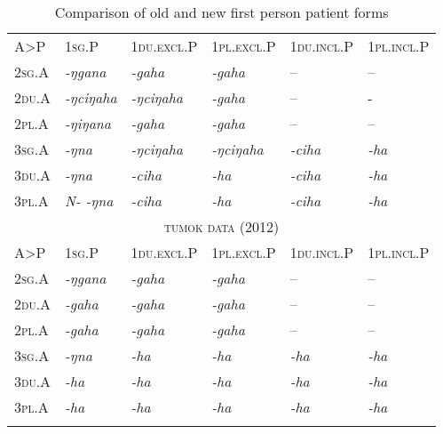 \begin{table}[htp]
\begin{tabular}{llllll}
\lsptoprule
\multicolumn{6}{c}{{\scshape omruwa data (1984)}} \\
\midrule
	A>P			& {\scshape 1sg.P}		&{\scshape 1du.excl.P} &{\scshape 1pl.excl.P}		&{\scshape 1du.incl.P} &{\scshape 1pl.incl.P}	\\
\midrule                                                                    
{\scshape 2sg.A}&\emph{-ŋgana}	&\emph{-gaha}	&\emph{-gaha}			 & --					 &--						\\
{\scshape 2du.A}&\emph{-ŋciŋaha}	&\emph{-ŋciŋaha} &\emph{-gaha}			 & --					 &-						\\
{\scshape 2pl.A}&\emph{-ŋiŋana}	&\emph{-gaha}	&\emph{-gaha}			  & --					&--						\\
{\scshape 3sg.A}&\emph{-ŋna}		&\emph{-ŋciŋaha}	 &\emph{-ŋciŋaha}	&  \emph{-ciha}& \emph{-ha}		\\
{\scshape 3du.A}&\emph{-ŋna}		&\emph{-ciha}	&\emph{-ha}				&  \emph{-ciha}& \emph{-ha}		\\
{\scshape 3pl.A}&\emph{N- -ŋna}	&\emph{-ciha}	&\emph{-ha}			&	  \emph{-ciha}& \emph{-ha}	\\
\midrule
\multicolumn{6}{c}{{\scshape tumok data (2012)}} \\
\midrule
	A>P			& {\scshape 1sg.P}&		{\scshape 1du.excl.P}&{\scshape 1pl.excl.P}	& {\scshape 1du.incl.P} &{\scshape 1pl.incl.P}	\\
\midrule                                                             
{\scshape 2sg.A}&\emph{-ŋgana}	&\emph{-gaha	}	&\emph{-gaha}		&-- 					&--					\\
{\scshape 2du.A}&\emph{-gaha}		&\emph{-gaha	}	&\emph{-gaha}		&--					&--					\\
{\scshape 2pl.A}&\emph{-gaha}		&\emph{-gaha	}	&\emph{-gaha}		&--					&--						\\
{\scshape 3sg.A}&\emph{-ŋna}		&\emph{-ha}	&\emph{-ha}			&\emph{-ha}	&\emph{-ha}	\\
{\scshape 3du.A}&\emph{-ha}			&\emph{-ha}	&\emph{-ha}			&\emph{-ha}	&\emph{-ha}	\\
{\scshape 3pl.A}&\emph{-ha}			&\emph{-ha}	&\emph{-ha}			&\emph{-ha}	&\emph{-ha}	\\
\lspbottomrule
\end{tabular}\\
\caption{Comparison of old and new first person patient forms}\label{omruwa}
\end{table}

